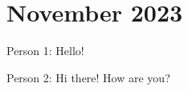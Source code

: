 \documentclass{book}
\begin{document}
\chapter{November 2023}

Person 1: Hello! 

Person 2: Hi there! How are you? 
\end{document}

